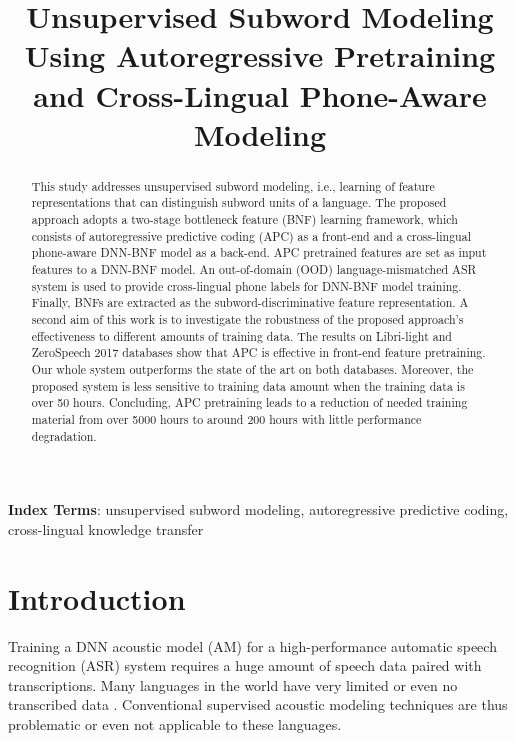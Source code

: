 \documentclass[a4paper]{article}
\title{Unsupervised Subword Modeling Using Autoregressive Pretraining and Cross-Lingual Phone-Aware Modeling}
\begin{document}
\maketitle
% 
\begin{abstract}
This study addresses unsupervised subword modeling, i.e., learning of 
feature representations that can distinguish subword units of a language. 
The proposed approach adopts a two-stage bottleneck feature (BNF) learning framework, which consists of 
autoregressive predictive coding (APC) as a front-end  and a cross-lingual phone-aware DNN-BNF model as a back-end. 
APC pretrained features are set as input features to a DNN-BNF model. An out-of-domain (OOD) language-mismatched ASR system is used to provide cross-lingual phone labels for DNN-BNF model training. Finally, BNFs are extracted as the subword-discriminative feature representation. A second aim of this work is to investigate the robustness of the proposed approach's effectiveness to different amounts of training data. The results on Libri-light and ZeroSpeech 2017 databases show that APC is effective in front-end feature pretraining.
Our whole system outperforms the state of the art on both databases.
Moreover, the proposed system is less sensitive to training data amount  when the training data is over 50 hours.  
Concluding, APC pretraining leads to a reduction of needed training material from over 5000 hours to around 200 hours with little performance degradation.


\end{abstract}
\noindent\textbf{Index Terms}: unsupervised subword modeling, autoregressive predictive coding, cross-lingual knowledge transfer

\section{Introduction}

Training a DNN acoustic model (AM) for a high-performance automatic speech recognition (ASR) system requires a huge amount of speech data paired with  transcriptions. 
Many languages in the world have very limited or even no transcribed data \cite{dunbar2017zero}. 
Conventional supervised acoustic modeling techniques are thus problematic or even not applicable to these languages.
\end{document}
